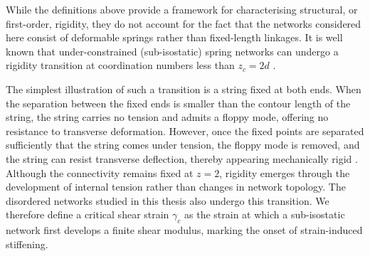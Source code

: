 \documentclass[asymmetricmargins]{library/duthesis}%
\begin{document}
While the definitions above provide a framework for characterising structural, or first-order, rigidity, they do not account for the fact that the networks considered here consist of deformable springs rather than fixed-length linkages. It is well known that under-constrained (sub-isostatic) spring networks can undergo a rigidity transition at coordination numbers less than $z_c=2d$ \cite{feng_percolation_1984, sharma_strain-controlled_2016, wyart_elasticity_2008, feng_nonlinear_2016, vermeulen_geometry_2017, rens_micromechanical_2018}.

The simplest illustration of such a transition is a string fixed at both ends. When the separation between the fixed ends is smaller than the contour length of the string, the string carries no tension and admits a floppy mode, offering no resistance to transverse deformation. However, once the fixed points are separated sufficiently that the string comes under tension, the floppy mode is removed, and the string can resist transverse deflection, thereby appearing mechanically rigid \cite{biot_mechanics_1965}. Although the connectivity remains fixed at $z = 2$, rigidity emerges through the development of internal tension rather than changes in network topology. The disordered networks studied in this thesis also undergo this transition. We therefore define a critical shear strain $\gamma_c$ as the strain at which a sub-isostatic network first develops a finite shear modulus, marking the onset of strain-induced stiffening.
\end{document}

